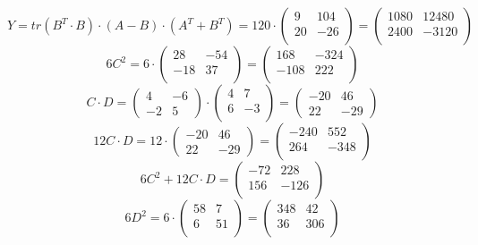 \documentclass[a4paper,12pt]{article}
\begin{document}
\[
Y =tr(B^T \cdot B) \cdot (A -B) \cdot (A^T + B^T) = 
120 \cdot \begin{pmatrix}
9 & 104 \\ 20 & -26\\
\end{pmatrix} = 
\begin{pmatrix}
1080 & 12480\\ 2400 & -3120\\
\end{pmatrix}
\]
\[
6C^2 = 6 \cdot \begin{pmatrix}
28 & -54 \\ -18 & 37\\
\end{pmatrix} = \begin{pmatrix}
168 & -324 \\ -108  & 222\\
\end{pmatrix}
\]
\[
C \cdot D = \begin{pmatrix}
4 & -6 \\ -2 & 5 
\end{pmatrix} \cdot 
\begin{pmatrix}
4 & 7 \\ 6 & -3\\
\end{pmatrix}  = \begin{pmatrix}
-20 & 46\\ 22 & -29
\end{pmatrix}
\]
\[
12C \cdot D = 12 \cdot \begin{pmatrix}
-20 & 46 \\ 22 & -29
\end{pmatrix} = \begin{pmatrix}
-240 & 552 \\ 264 & -348\\
\end{pmatrix}
\]
\[
6C^2  + 12C \cdot D =\begin{pmatrix}
-72 & 228\\ 156 & -126\\
\end{pmatrix}
\]
\[
6D^2 = 6 \cdot \begin{pmatrix}
58 & 7 \\ 6 & 51\\
\end{pmatrix} = \begin{pmatrix}
348 & 42 \\ 36 & 306\\
\end{pmatrix}
\]
\end{document}
